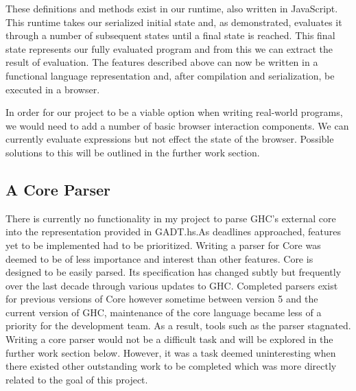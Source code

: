 These definitions and methods exist in our runtime, also written
in JavaScript. This runtime takes our serialized initial state
and, as demonstrated, evaluates it through a number of subsequent
states until a final state is reached. This final state represents
our fully evaluated program and from this we can extract the result
of evaluation. The features described above can now be written
in a functional language representation and, after compilation
and serialization, be executed in a browser. 

In order for our project to be a viable option when writing 
real-world programs, we would need to add a number of basic browser
interaction components. We can currently evaluate expressions but
not effect the state of the browser. Possible solutions to this
will be outlined in the further work section.

\subsection{A Core Parser}
There is currently no functionality in my project to parse GHC's
external core into the representation provided in GADT.hs.As 
deadlines approached, features yet to be implemented had to be
prioritized. Writing a parser for Core was deemed to be of less
importance and interest than other features. Core is designed to
be easily parsed. Its specification has changed subtly but frequently
over the last decade through various updates to GHC. Completed
parsers exist for previous versions of Core however sometime between
version 5 and the current version of GHC, maintenance of the core
language became less of a priority for the development team. As
a result, tools such as the parser stagnated. Writing a core parser
would not be a difficult task and will be explored in the further
work section below. However, it was a task deemed uninteresting 
when there existed other outstanding work to be completed which was
more directly related to the goal of this project. 


